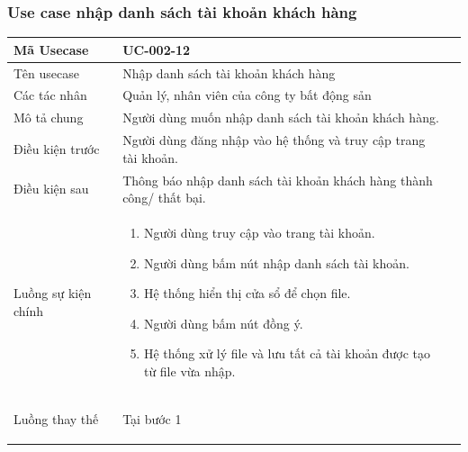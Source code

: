 \documentclass[12pt,a4paper]{article}
\begin{document}
    \subsubsection*{Use case nhập danh sách tài khoản khách hàng}
    \begin{table}[H]
        \centering
        \begin{tabular}{|p{3.5cm}|p{11.5cm}|c|}
            \hline
            Mã Usecase      & UC-002-12                                                           \\
            \hline
            Tên usecase     & Nhập danh sách tài khoản khách hàng                                 \\
            \hline
            Các tác nhân    & Quản lý, nhân viên của công ty bất động sản                         \\
            \hline
            Mô tả chung     & Người dùng muốn nhập danh sách tài khoản khách hàng.                \\
            \hline
            Điều kiện trước & Người dùng đăng nhập vào hệ thống và truy cập trang tài khoản.      \\
            \hline
            Điều kiện sau   & Thông báo nhập danh sách tài khoản khách hàng thành công/ thất bại. \\
            \hline
            Luồng sự kiện chính & \vspace{-.8cm}\begin{enumerate}
                                                    \item Người dùng truy cập vào trang tài khoản.
                                                    \item Người dùng bấm nút nhập danh sách tài khoản.
                                                    \item Hệ thống hiển thị cửa sổ để chọn file.
                                                    \item Người dùng bấm nút đồng ý.
                                                    \item Hệ thống xử lý file và lưu tất cả tài khoản được tạo từ file vừa nhập.
            \end{enumerate}
            \\
            \hline
            Luồng thay thế & Tại bước 1\newline
            \vspace{-.8cm}\begin{itemize}

\end{itemize}
\end{tabular}
\end{table}
\end{document}

